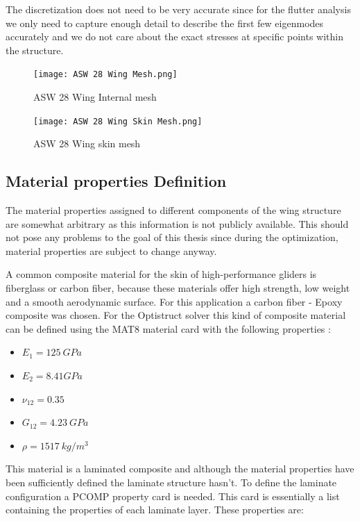 The discretization does not need to be very accurate since for the
flutter analysis we only need to capture enough detail to describe the
first few eigenmodes accurately and we do not care about the exact
stresses at specific points within the structure.

\begin{figure}[H]
\centering
\texttt{[image: ASW 28 Wing Mesh.png]}
\caption{ASW 28 Wing Internal mesh}
\end{figure}

\begin{figure}[H]
\centering
\texttt{[image: ASW 28 Wing Skin Mesh.png]}
\caption{ASW 28 Wing skin mesh}
\end{figure}

\subsection{Material properties Definition}
\label{material-properties-definition.}

The material properties assigned to different components of the wing
structure are somewhat arbitrary as this information is not publicly
available. This should not pose any problems to the goal of this thesis
since during the optimization, material properties are subject to change
anyway.

A common composite material for the skin of high-performance gliders is
fiberglass or carbon fiber, because these materials offer high strength,
low weight and a smooth aerodynamic surface. For this application a
carbon fiber - Epoxy composite was chosen. For the Optistruct solver
this kind of composite material can be defined using the MAT8 material
card with the following properties \cite{matweb}:

\begin{itemize}
\item
  \(E_{1} = 125\ GPa\)
\item
  \(E_{2} = 8.41GPa\)
\item
  \(\nu_{12} = 0.35\)
\item
  \(G_{12} = 4.23\ GPa\)
\item
  \(\rho = 1517\ kg\text{/}m^{3}\)
\end{itemize}

This material is a laminated composite and although the material
properties have been sufficiently defined the laminate structure hasn't.
To define the laminate configuration a PCOMP property card is needed.
This card is essentially a list containing the properties of each
laminate layer. These properties are:

